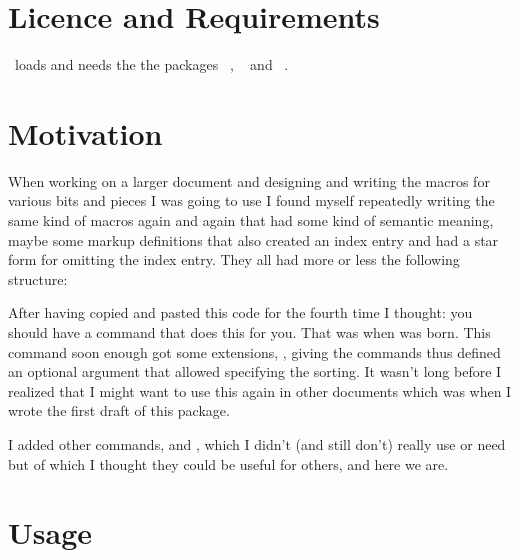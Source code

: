 \documentclass[load-preamble,add-index,scrartcl={DIV10}]{cnltx-doc}
\begin{document}
\section{Licence and Requirements}\label{sec:license}
\license

\idxcmds\ loads and needs the the packages ~\cite{pkg:etoolbox},
~\cite{pkg:pgfopts} and ~\cite{pkg:ltxcmds}.

\section{Motivation}
When working on a larger document and designing and writing the macros for
various bits and pieces I was going to use I found myself repeatedly writing
the same kind of macros again and again that had some kind of semantic
meaning, maybe some markup definitions that also created an index entry and
had a star form for omitting the index entry.  They all had more or less the
following structure:

\begin{sourcecode}
  \makeatletter
  \newcommand*\cmd{\@ifstar\cmd@star\cmd@nostar}
  \newcommand*\cmd@star[1]{\cmd@base{#1}}
  \newcommand*\cmd@nostar[1]{\cmd@base{#1}\cmd@idx{#1}}
  \newcommand*\cmd@base[1]{\textit{#1}}
  \newcommand*\cmd@idx[1]{\index{#1@\cmd@base{#1}}}
  \makeatother
\end{sourcecode}

After having copied and pasted this code for the fourth time I thought: you
should have a command that does this for you.  That was when 
was born.  This command soon enough got some extensions, \eg, giving
the commands thus defined an optional argument that allowed specifying the
sorting.  It wasn't long before I realized that I might want to use this
 again in other documents which was when I wrote the first
draft of this package.

I added other commands,  and , which I
didn't (and still don't) really use or need but of which I thought they could
be useful for others, and here we are.

\section{Usage}\label{sec:usage}
\end{document}
